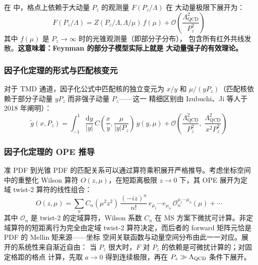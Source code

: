 \documentclass[11pt,a4paper]{ctexart}
\newcommand{\LaMET}{\text{LaMET}}
\newcommand{\MSbarM}{\overline{\text{MS}}}
\newcommand{\order}[1]{\mathcal{O}(#1)}
\begin{document}
在 \LaMET{} 中，格点上依赖于大动量 $P_z$ 的观测量 $F(P_z/\Lambda)$ 在
大动量极限下展开为：
\begin{equation}\label{eq:lamet_expansion}
F(P_z/\Lambda) = Z(P_z/\Lambda, \Lambda/\mu) \, f(\mu)
+ \order{\frac{\Lambda_{\text{QCD}}^{2}}{P_z^{2}}}
\end{equation}
其中 $f(\mu)$ 是 $P_z \to \infty$ 时的光锥观测量（即部分子分布），
包含所有红外共线发散。\textbf{这意味着：Feynman 的部分子模型实际上就是
大动量强子的有效理论。}

\subsubsection{因子化定理的形式与匹配核变元}

对于 TMD 通道，因子化公式中匹配核的独立变元为 $x/y$ 和
$\mu/(yP_z)$（匹配核依赖于部分子动量 $yP_z$ 而非强子动量 $P_z$——这一
精细区别由 Izubuchi、Ji 等人于 2018 年阐明）：
\begin{equation}\label{eq:lamet_factorization}
\tilde{g}(x, P_z) = \int_{-1}^{1} \frac{\mathrm{d}y}{|y|} \,
C\!\left(\frac{x}{y}, \frac{\mu}{|y|P_z}\right) \,
g(y, \mu) + \order{\frac{\Lambda_{\text{QCD}}^{2}}{P_z^{2}},\;
\frac{\Lambda_{\text{QCD}}^{2}}{x^{2}P_z^{2}}}
\end{equation}

\subsubsection{因子化定理的 OPE 推导}

准 PDF 到光锥 PDF 的匹配关系可以通过算符乘积展开严格推导。考虑坐标空间
中的重整化 Wilson 算符 $O(z,\mu)$，在短距离极限 $z \to 0$ 下，其 OPE
展开为定域 twist-2 算符的线性组合：
\begin{equation}
O(z, \mu) = \sum_n C_n(\mu^2 z^2) \, \frac{(-iz)^n}{n!} \,
e_{\mu_1}\cdots e_{\mu_n} \, \mathcal{O}_n^{\mu_1\cdots\mu_n}(\mu)
+ \cdots
\end{equation}
其中 $\mathcal{O}_n$ 是 twist-2 的定域算符，Wilson 系数 $C_n$ 在
$\MSbarM$ 方案下微扰可计算。非定域算符的短距离行为完全由定域 twist-2
算符决定，而后者的 forward 矩阵元恰是 PDF 的 Mellin 矩来源——坐标
空间关联函数与动量空间分布由此一一对应。展开的系统性来自渐近自由：
当 $P_z$ 很大时，$F$ 对 $P_z$ 的依赖是可微扰计算的；对固定格距的格点
计算，先取 $a \to 0$ 得到连续极限，再在 $P_z \gg \Lambda_{\rm QCD}$
条件下展开。
\end{document}
